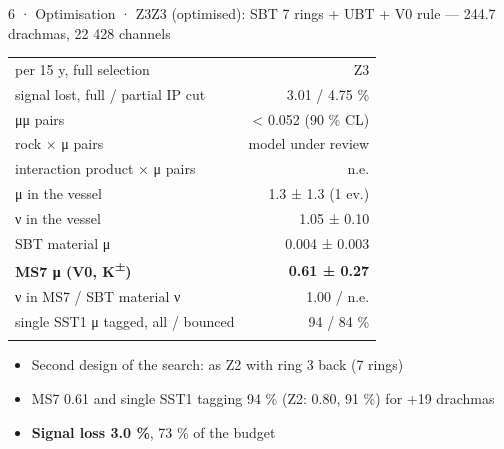 \begin{btframe}{6 · Optimisation · Z3}{Z3 (optimised): SBT 7 rings + UBT + V0 rule — 244.7 drachmas, 22 428 channels}
{\par}
\vspace{2.46pt}
\noindent \begin{minipage}[c]{0.5\linewidth}
{\fontsize{5.31pt}{6.90pt}\selectfont\setlength{\tabcolsep}{3.72pt}\renewcommand{\arraystretch}{1.42}
\begin{tabular}{lr}
\textcolor{muted}{per 15 y, full selection} & \textcolor{muted}{Z3} \\\headrule
signal lost, full / partial IP cut & 3.01 / 4.75 \% \\\rowrule
μμ pairs & < 0.052 (90 \% CL) \\\rowrule
rock × μ pairs & \textcolor{muted}{model under review} \\\rowrule
interaction product × μ pairs & \textcolor{muted}{n.e.} \\\rowrule
μ in the vessel & 1.3 ± 1.3 (1 ev.) \\\rowrule
ν in the vessel & 1.05 ± 0.10 \\\rowrule
SBT material μ & 0.004 ± 0.003 \\\rowrule
\rowcolor{tint}\bfseries MS7 μ (V0, K\textsuperscript{±}) & \bfseries 0.61 ± 0.27 \\\rowrule
ν in MS7 / SBT material ν & 1.00 / \textcolor{muted}{n.e.} \\\rowrule
single SST1 μ tagged, all / bounced & 94 / 84 \% \\\rowrule
\end{tabular}\par}
\end{minipage}%
\hfill%
\begin{minipage}[c]{0.5\linewidth}
{\fontsize{6.15pt}{8.60pt}\selectfont
\begin{itemize}
  \item Second design of the search: as Z2 with ring 3 back (7 rings)
  \item MS7 0.61 and single SST1 tagging 94 \% (Z2: 0.80, 91 \%) for +19 drachmas
  \item \textbf{Signal loss 3.0 \%}, 73 \% of the budget
\end{itemize}}
\end{minipage}\par
{}
\end{btframe}

